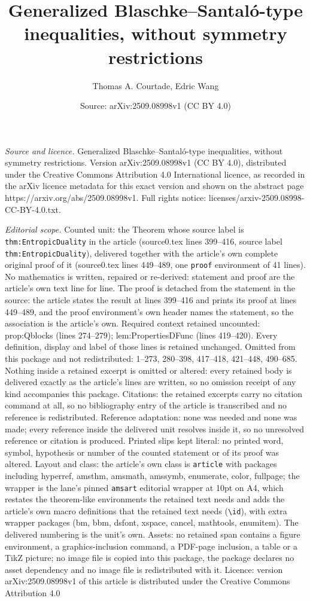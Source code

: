 \documentclass[10pt,a4paper]{amsart}
\title[Generalized Blaschke--Santal\'o-type inequalities, without s]{Generalized Blaschke--Santal\'o-type inequalities, without symmetry restrictions}
\author{Thomas A. Courtade, Edric Wang}
\date{Source: arXiv:2509.08998v1 (CC BY 4.0)}
\begin{document}
\maketitle

\noindent\emph{Source and licence.} Generalized Blaschke--Santal\'o-type inequalities, without symmetry restrictions. Version arXiv:2509.08998v1 (CC BY 4.0), distributed under the Creative Commons Attribution 4.0 International licence, as recorded in the arXiv licence metadata for this exact version and shown on the abstract page https://arxiv.org/abs/2509.08998v1. Full rights notice: licenses/arxiv-2509.08998-CC-BY-4.0.txt.\par\smallskip

\noindent\textit{Editorial scope.} Counted unit: the Theorem whose source label is \texttt{thm:EntropicDuality} in the article (source0.tex lines 399--416, source label \texttt{thm:EntropicDuality}), delivered together with the article's own complete original proof of it (source0.tex lines 449--489, one \texttt{proof} environment of 41 lines). No mathematics is written, repaired or re-derived: statement and proof are the article's own text line for line. The proof is detached from the statement in the source: the article states the result at lines 399--416 and prints its proof at lines 449--489, and the proof environment's own header names the statement, so the association is the article's own. Required context retained uncounted: prop:Qblocks (lines 274--279); lem:PropertiesDFunc (lines 419--420). Every definition, display and label of those lines is retained unchanged. Omitted from this package and not redistributed: 1--273, 280--398, 417--418, 421--448, 490--685. Nothing inside a retained excerpt is omitted or altered: every retained body is delivered exactly as the article's lines are written, so no omission receipt of any kind accompanies this package. Citations: the retained excerpts carry no citation command at all, so no bibliography entry of the article is transcribed and no reference is redistributed. Reference adaptation: none was needed and none was made; every reference inside the delivered unit resolves inside it, so no unresolved reference or citation is produced. Printed slips kept literal: no printed word, symbol, hypothesis or number of the counted statement or of its proof was altered. Layout and class: the article's own class is \texttt{article} with packages including hyperref, amsthm, amsmath, amssymb, enumerate, color, fullpage; the wrapper is the lane's pinned \texttt{amsart} editorial wrapper at 10pt on A4, which restates the theorem-like environments the retained text needs and adds the article's own macro definitions that the retained text needs (\texttt{\textbackslash id}), with extra wrapper packages (bm, bbm, dsfont, xspace, cancel, mathtools, enumitem). The delivered numbering is the unit's own. Assets: no retained span contains a figure environment, a graphics-inclusion command, a PDF-page inclusion, a table or a TikZ picture; no image file is copied into this package, the package declares no asset dependency and no image file is redistributed with it. Licence: version arXiv:2509.08998v1 of this article is distributed under the Creative Commons Attribution 4.0 
\end{document}
